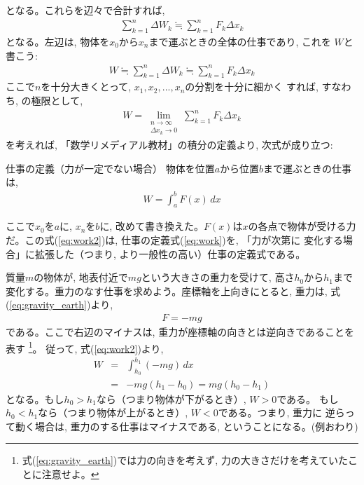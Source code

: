 となる。これらを辺々で合計すれば, 
\begin{eqnarray}\sum_{k=1}^{n}\Delta W_k\fallingdotseq \sum_{k=1}^{n}F_k\Delta x_k\end{eqnarray}
となる。左辺は, 物体を$x_0$から$x_n$まで運ぶときの全体の仕事であり, これを
$W$と書こう:
\begin{eqnarray}
W\fallingdotseq \sum_{k=1}^{n}\Delta W_k\fallingdotseq\sum_{k=1}^{n}F_k\Delta x_k \label{eq:one_step_before_work2}
\end{eqnarray}
ここで$n$を十分大きくとって, $x_1, x_2, ..., x_n$の分割を十分に細かく
すれば, すなわち, の極限として, 
\begin{eqnarray}
W=\lim_{\substack{n\rightarrow \infty\\\Delta x_k\rightarrow 0}}\sum_{k=1}^{n}F_k\Delta x_k
\end{eqnarray}
を考えれば, 「数学リメディアル教材」の積分の定義より, 次式が成り立つ:
\begin{itembox}{仕事の定義（力が一定でない場合）}
物体を位置$a$から位置$b$まで運ぶときの仕事は, 
\begin{eqnarray}
W=\int_{a}^{b} F(x)\,dx \label{eq:work2}
\end{eqnarray}
\end{itembox}
ここで$x_0$を$a$に, $x_n$を$b$に, 改めて書き換えた。$F(x)$は$x$の各点で物体が受ける力
だ。この式(\ref{eq:work2})は, 仕事の定義式(\ref{eq:work})を, 「力が次第に
変化する場合」に拡張した（つまり, より一般性の高い）仕事の定義式である。\mv

\begin{exmpl}\label{ex:work_fall}
 質量$m$の物体が, 地表付近で$mg$という大きさの重力を受けて, 高さ$h_0$から$h_1$まで
変化する。重力のなす仕事を求めよう。座標軸を上向きにとると, 重力は, 式(\ref{eq:gravity_earth})より, 
\begin{eqnarray}F=-mg\end{eqnarray}
である。ここで右辺のマイナスは, 重力が座標軸の向きとは逆向きであることを表す
\footnote{式(\ref{eq:gravity_earth})では力の向きを考えず, 力の大きさだけを考えていたことに注意せよ。}。
従って, 式(\ref{eq:work2})より, 
\begin{eqnarray}
W&=&\int_{h_0}^{h_1} (-mg)\,dx\nonumber\\
 &=&-mg(h_1-h_0)=mg(h_0-h_1)
\end{eqnarray}
となる。もし$h_0>h_1$なら（つまり物体が下がるとき）, $W>0$である。
もし$h_0<h_1$なら（つまり物体が上がるとき）, $W<0$である。つまり, 重力に
逆らって動く場合は, 重力のする仕事はマイナスである, ということになる。(例おわり)
\end{exmpl}

